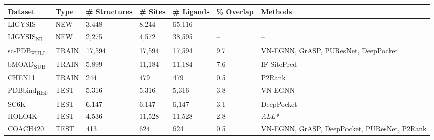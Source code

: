 \begin{landscape}
\begin{longtable}{|M{24mm}|M{20mm}|M{27mm}|M{20mm}|M{25mm}|M{25mm}|M{58mm}|}
\hline
\textbf{Dataset}    & \textbf{Type}  & \textbf{\# Structures} & \textbf{\# Sites} & \# \textbf{Ligands} & \textbf{\% Overlap} & \textbf{Methods}                                      \\ \hline
\endfirsthead
%
\endhead
%
LIGYSIS    & NEW   & 3,448         & 8,244    & 65,116     & --          & --                                            \\ \hline
LIGYSIS\textsubscript{NI}  & NEW   & 2,275         & 4,572    & 38,595     & --          & --                                            \\ \hline
sc-PDB\textsubscript{FULL} & TRAIN & 17,594        & 17,594   & 17,594     & 9.7        & VN-EGNN, GrASP, PUResNet, DeepPocket         \\ \hline
bMOAD\textsubscript{SUB}   & TRAIN & 5,899         & 11,184   & 11,184     & 7.6        & IF-SitePred                                  \\ \hline
CHEN11     & TRAIN & 244           & 479      & 479        & 0.5        & P2Rank                                       \\ \hline
PDBbind\textsubscript{REF} & TEST  & 5,316         & 5,316    & 5,316      & 3.8        & VN-EGNN                                      \\ \hline
SC6K       & TEST  & 6,147         & 6,147    & 6,147      & 3.1        & DeepPocket                                   \\ \hline
HOLO4K     & TEST  & 4,536         & 11,528   & 11,528     & 2.8        & \textit{ALL*}                                         \\ \hline
COACH420   & TEST  & 413           & 624      & 624        & 0.5        & VN-EGNN, GrASP, DeepPocket, PUResNet, P2Rank \\ \hline

\end{longtable}
\end{landscape}
